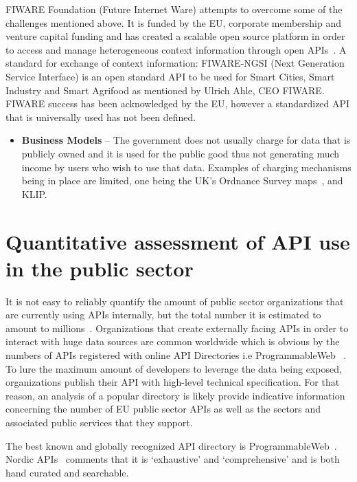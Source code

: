 FIWARE Foundation (Future Internet Ware) attempts to
overcome some of the challenges mentioned above. It is funded by
the EU, corporate membership and venture capital funding and has
created a scalable open source platform in order to access and manage heterogeneous context information through
open APIs~\citep{eu_innovation_programmes}. A standard for exchange of context information: FIWARE-NGSI
(Next Generation Service Interface) is an open standard API to be used for Smart
Cities, Smart Industry and Smart Agrifood as mentioned by Ulrich Ahle, CEO FIWARE. FIWARE success
has been acknowledged by the EU, however a standardized API that is universally used has not been defined.
\begin{itemize}
	\item \textbf{Business Models} – The government does not usually charge for data that is publicly owned and it is used for the public good thus not generating much income by users
	who wish to use that data. Examples of charging mechanisms being in place
	are	limited, one being the UK’s Ordnance Survey maps~\citep{os_places}, and KLIP.
\end{itemize}

\section{Quantitative assessment of API use in the public sector}

It is not easy to reliably quantify the amount of public sector organizations
that are currently using APIs internally, but the total number it is estimated to amount to millions~\citep{deloitte_insights}. Organizations
that create externally facing APIs in order to interact with huge data sources
are common worldwide which is obvious by the numbers of APIs registered with online API Directories i.e ProgrammableWeb ~\citep{programmableweb_apis}. To lure the maximum amount of developers to leverage the
data being exposed, organizations publish their API with high-level
technical specification. For that reason, an analysis of a popular
directory is likely provide indicative information concerning the number of EU
public sector APIs as well as the sectors and associated public services that they support.

The best known and globally recognized API directory is ProgrammableWeb~\citep{programmableweb_search}.
Nordic APIs~\citep{nordic_apis} comments that it is ‘exhaustive’ and ‘comprehensive’ and is
both hand curated and searchable. 

